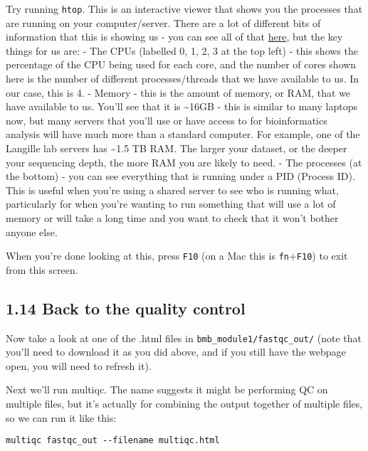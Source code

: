 \documentclass[
]{book}
\begin{document}
Try running \texttt{htop}. This is an interactive viewer that shows you the processes that are running on your computer/server. There are a lot of different bits of information that this is showing us - you can see all of that \href{https://monovm.com/blog/what-is-htop-and-what-does-it-do/\#:~:text=Htop\%20is\%20an\%20interactive\%20system,system\%20processes\%20can\%20be\%20viewed.}{here}, but the key things for us are:
- The CPUs (labelled 0, 1, 2, 3 at the top left) - this shows the percentage of the CPU being used for each core, and the number of cores shown here is the number of different processes/threads that we have available to us. In our case, this is 4.
- Memory - this is the amount of memory, or RAM, that we have available to us. You'll see that it is \textasciitilde16GB - this is similar to many laptops now, but many servers that you'll use or have access to for bioinformatics analysis will have much more than a standard computer. For example, one of the Langille lab servers has \textasciitilde1.5 TB RAM. The larger your dataset, or the deeper your sequencing depth, the more RAM you are likely to need.
- The processes (at the bottom) - you can see everything that is running under a PID (Process ID). This is useful when you're using a shared server to see who is running what, particularly for when you're wanting to run something that will use a lot of memory or will take a long time and you want to check that it won't bother anyone else.

When you're done looking at this, press \texttt{F10} (on a Mac this is \texttt{fn}+\texttt{F10}) to exit from this screen.

\subsection{1.14 Back to the quality control}\label{back-to-the-quality-control}

Now take a look at one of the .html files in \texttt{bmb\_module1/fastqc\_out/} (note that you'll need to download it as you did above, and if you still have the webpage open, you will need to refresh it).

Next we'll run multiqc. The name suggests it might be performing QC on multiple files, but it's actually for combining the output together of multiple files, so we can run it like this:

\begin{verbatim}
multiqc fastqc_out --filename multiqc.html
\end{verbatim}
\end{document}

